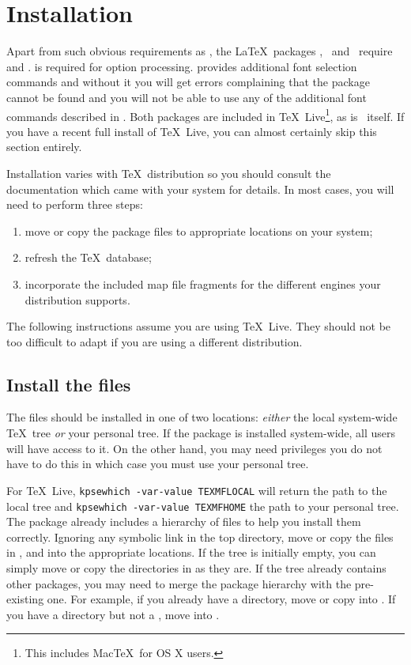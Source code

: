 \documentclass[11pt,british]{article}
\begin{document}
\section{Installation}

Apart from such obvious requirements as \LaTeXe, the \LaTeX\ packages , \ and \ require  and .  is required for option processing.  provides additional font selection commands and without it you will get errors complaining that the package cannot be found and you will not be able to use any of the additional font commands described in . Both packages are included in \TeX~Live\footnote{This includes Mac\TeX\ for OS X users.}, as is \ itself. If you have a recent full install of \TeX~Live, you can almost certainly skip this section entirely.

Installation varies with \TeX\ distribution so you should consult the documentation which came with your system for details. In most cases, you will need to perform three steps:
		\begin{enumerate}
			\item move or copy the package files to appropriate locations on your system;
			\item refresh the \TeX\ database;
			\item incorporate the included map file fragments for the different engines your distribution supports.
		\end{enumerate}

The following instructions assume you are using \TeX~Live. They should not be too difficult to adapt if you are using a different distribution.

\subsection{Install the files}

The files should be installed in one of two locations: \emph{either} the local system-wide \TeX\ tree \emph{or} your personal tree. If the package is installed system-wide, all users will have access to it. On the other hand, you may need privileges you do not have to do this in which case you must use your personal tree.

For \TeX~Live, \verb|kpsewhich -var-value TEXMFLOCAL| will return the path to the local tree and \verb|kpsewhich -var-value TEXMFHOME| the path to your personal tree. The package already includes a hierarchy of files to help you install them correctly. Ignoring any symbolic link in the top directory, move or copy the files in ,  and  into the appropriate locations. If the tree is initially empty, you can simply move or copy the directories in as they are. If the tree already contains other packages, you may need to merge the package hierarchy with the pre-existing one. For example, if you already have a  directory, move or copy  into . If you have a  directory but not a , move  into .
\end{document}
